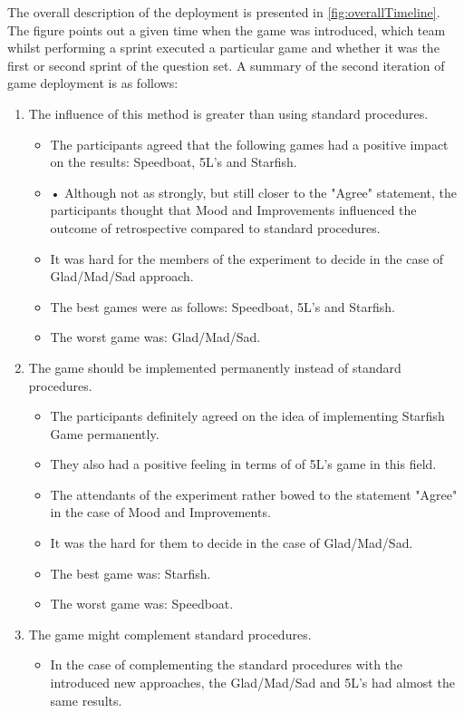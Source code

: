 The overall description of the deployment is presented in \autoref{fig:overallTimeline}. The figure points out a given time when the game was introduced, which team whilst performing a sprint executed a particular game and whether it was the first or second sprint of the question set. A summary of the second iteration of game deployment is as follows:
\begin{enumerate}
    \item The influence of this method is greater than using standard procedures.
    \begin{itemize}
        \item The participants agreed that the following games had a positive impact on the results: Speedboat, 5L's and Starfish.
        \item •	Although not as strongly, but still closer to the "Agree" statement, the participants thought that Mood and Improvements influenced the outcome of retrospective compared to standard procedures.
        \item It was hard for the members of the experiment to decide in the case of Glad/Mad/Sad approach.
        \item The best games were as follows: Speedboat, 5L's and Starfish.
        \item The worst game was: Glad/Mad/Sad.
    \end{itemize}
    \item The game should be implemented permanently instead of standard procedures.
    \begin{itemize}
        \item The participants definitely agreed on the idea of implementing Starfish Game permanently.
        \item They also had a positive feeling in terms of of 5L's game in this field.
        \item The attendants of the experiment rather bowed to the statement "Agree" in the case of Mood and Improvements.
        \item It was the hard for them to decide in the case of Glad/Mad/Sad.
        \item The best game was: Starfish.
        \item The worst game was: Speedboat.
    \end{itemize}
    \item The game might complement standard procedures.
    \begin{itemize}
        \item In the case of complementing the standard procedures with the introduced new approaches, the Glad/Mad/Sad and 5L's had almost the same results.

\end{itemize}
\end{enumerate}
